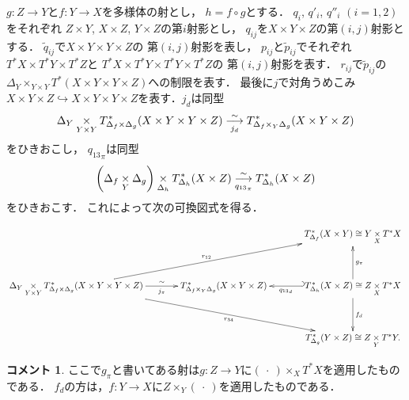 \documentclass[leqno, 10pt, a4paper, dvipdfmx]{jsarticle}
\theoremstyle{definition}
\numberwithin{equation}{section}
\newcommand{\blk}{\mathord{\ \cdot\ }}
\newcommand{\mres}[2][]{{\left.{#1}\right\rvert}_{#2}}
\newcommand{\dpb}[1][]{\mathbin{\mathop{\times}\limits_{#1}}}
\newcommand{\tpb}[1][]{\mathbin{\mathop{\times}\nolimits_{#1}}}
\theoremstyle{mystyle}
\newtheorem{CMT}[AXM]{コメント}
\newcommand{\mpb}[1][]{{#1}_{\pi}} %
\newcommand{\mdiff}[1][]{{#1}_{d}} %
\newcommand{\cotb}[1][]{T^{\ast}{#1}}
\newcommand{\conm}[2][]{T_{#1}^{\hspace{0.7pt}\ast}{#2}}
\newcommand{\diag}[1][]{\Delta_{#1}}
\begin{document}
\(g\colon Z\to Y\)と\(f\colon Y\to X\)を多様体の射とし，
\(h=f\circ g\)とする．
\(q_i\), \(q'_i\), \(q''_i\) \((i=1,2)\)をそれぞれ
\(Z\times Y\), \(X\times Z\), \(Y\times Z\)の第\(i\)射影とし，
\(q_{ij}\)を\(X\times Y\times Z\)の第\((i,j)\)射影とする．
\(\widetilde{q}_{ij}\)で\(X\times Y\times Y\times Z\)の
第\((i,j)\)射影を表し，
\(p_{ij}\)と\(\widetilde{p}_{ij}\)でそれぞれ
\(\cotb[X]\times\cotb[Y]\times\cotb[Z]\)と
\(\cotb[X]\times\cotb[Y]\times\cotb[Y]\times\cotb[Z]\)の
第\((i,j)\)射影を表す．
\(r_{ij}\)で\(\widetilde{p}_{ij}\)の\(
  \diag[Y]\tpb[Y\times Y]\cotb[(X\times Y\times Y\times Z)]
\)への制限を表す．
最後に\(j\)で対角うめこみ\(
  X\times Y\times Z
  \hookrightarrow 
  X\times Y\times Y\times Z
\)を表す．\(\mdiff[j]\)は同型
\begin{equation}
  \diag[Y]\dpb[Y\times Y]
  \conm[{\diag[f]\times\diag[g]}]{(X\times Y\times Y\times Z)}
  \overunderset{\sim}{{\mdiff[j]}}{\longrightarrow}
  \conm[{\diag[f]\tpb[Y]\diag[g]}]{(X\times Y\times Z)}
\end{equation}
をひきおこし，
\(\mpb[{q_{13}}]\)は同型
\begin{equation}
  \left(
    \diag[f]
    \dpb[Y]
    \diag[g]
  \right)\dpb[{\diag[h]}]
  \conm[{\diag[h]}]{(X\times Z)}
  \overunderset{\sim}{{\mpb[{q_{13}}]}}{\longrightarrow}
  \conm[{\diag[h]}]{(X\times Z)}
\end{equation}
をひきおこす．
これによって次の可換図式を得る．

\begin{equation}
  \vcenter{\xymatrix@C=36pt@R=36pt{
    &
    &
    \conm[{\diag[f]}]{(X\times Y)}
    \cong
    Y\dpb[X]\cotb[X]
    \\
    \diag[Y]\dpb[Y\times Y]
    \conm[{\diag[f]\times\diag[g]}]{(X\times Y\times Y\times Z)}
    \ar[urr]^-{r_{12}}
    \ar[drr]_-{r_{34}}
    \ar[r]_-{\mpb[j]}^-{\sim}
    &
    \conm[{\diag[f]\tpb[Y]\diag[g]}]{(X\times Y\times Z)}
    &
    \conm[{\diag[h]}]{(X\times Z)}
    \cong
    Z\dpb[X]\cotb[X]
    \ar@{_{(}->}[l]^-{\mdiff[{q_{13}}]}
    \ar[d]^-{\mdiff[f]}
    \ar[u]_-{\mpb[g]}
    \\
    &
    &
    \conm[{\diag[g]}]{(Y\times Z)}
    \cong
    Z\dpb[Y]\cotb[Y].
  }}
\end{equation}

\begin{CMT}
  ここで\(\mpb[g]\)と書いてある射は\(
    g\colon Z\to Y
  \)に\((\blk)\tpb[X]\cotb[X]\)を適用したものである．
  \(\mdiff[f]\)の方は，\(f\colon Y\to X\)に\(Z\tpb[Y](\blk)
  \)を適用したものである．
\end{CMT}
\end{document}
